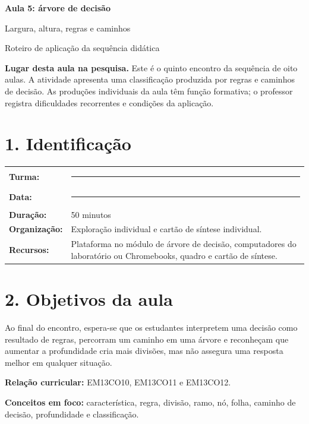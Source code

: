 \documentclass[12pt,a4paper]{article}
\newcommand{\bloco}[1]{%
  \vspace{0.25em}
  \noindent\colorbox{cinza}{\parbox{0.96\linewidth}{#1}}%
  \vspace{0.3em}
}
\begin{document}
\begin{center}
  {\LARGE\bfseries\color{azul} Aula 5: árvore de decisão}\par
  \vspace{0.25em}
  {\large Largura, altura, regras e caminhos}\par
  \vspace{0.35em}
  {\small Roteiro de aplicação da sequência didática}\par
\end{center}

\bloco{\textbf{Lugar desta aula na pesquisa.} Este é o quinto encontro da sequência de oito aulas. A atividade apresenta uma classificação produzida por regras e caminhos de decisão. As produções individuais da aula têm função formativa; o professor registra dificuldades recorrentes e condições da aplicação.}

\section*{1. Identificação}

\begin{tabularx}{\linewidth}{@{}>{\bfseries}p{4.1cm}X@{}}
Turma: & \rule{8.5cm}{0.35pt} \\
Data: & \rule{8.5cm}{0.35pt} \\
Duração: & 50 minutos \\
Organização: & Exploração individual e cartão de síntese individual. \\
Recursos: & Plataforma no módulo de árvore de decisão, computadores do laboratório ou Chromebooks, quadro e cartão de síntese. \\
\end{tabularx}

\section*{2. Objetivos da aula}

Ao final do encontro, espera-se que os estudantes interpretem uma decisão como resultado de regras, percorram um caminho em uma árvore e reconheçam que aumentar a profundidade cria mais divisões, mas não assegura uma resposta melhor em qualquer situação.

\textbf{Relação curricular:} EM13CO10, EM13CO11 e EM13CO12.

\textbf{Conceitos em foco:} característica, regra, divisão, ramo, nó, folha, caminho de decisão, profundidade e classificação.
\end{document}
